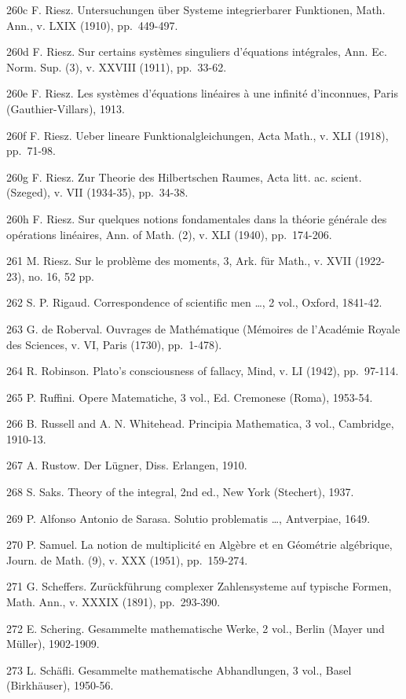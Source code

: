 260c F. Riesz. Untersuchungen über Systeme integrierbarer Funktionen, Math. Ann., v. LXIX (1910), pp.~449-497.

260d F. Riesz. Sur certains systèmes singuliers d'équations intégrales, Ann. Ec. Norm. Sup. (3), v. XXVIII (1911), pp.~33-62.

260e F. Riesz. Les systèmes d'équations linéaires à une infinité d'inconnues, Paris (Gauthier-Villars), 1913.

260f F. Riesz. Ueber lineare Funktionalgleichungen, Acta Math., v. XLI (1918), pp.~71-98.

260g F. Riesz. Zur Theorie des Hilbertschen Raumes, Acta litt. ac. scient. (Szeged), v. VII (1934-35), pp.~34-38.

260h F. Riesz. Sur quelques notions fondamentales dans la théorie générale des opérations linéaires, Ann. of Math. (2), v. XLI (1940), pp.~174-206.

261 M. Riesz. Sur le problème des moments, 3, Ark. für Math., v. XVII (1922-23), no. 16, 52 pp.

262 S. P. Rigaud. Correspondence of scientific men \ldots, 2 vol., Oxford, 1841-42.

263 G. de Roberval. Ouvrages de Mathématique (Mémoires de l'Académie Royale des Sciences, v. VI, Paris (1730), pp.~1-478).

264 R. Robinson. Plato's consciousness of fallacy, Mind, v. LI (1942), pp.~97-114.

265 P. Ruffini. Opere Matematiche, 3 vol., Ed. Cremonese (Roma), 1953-54.

266 B. Russell and A. N. Whitehead. Principia Mathematica, 3 vol., Cambridge, 1910-13.

267 A. Rustow. Der Lügner, Diss. Erlangen, 1910.

268 S. Saks. Theory of the integral, 2nd ed., New York (Stechert), 1937.

269 P. Alfonso Antonio de Sarasa. Solutio problematis \ldots, Antverpiae, 1649.

270 P. Samuel. La notion de multiplicité en Algèbre et en Géométrie algébrique, Journ. de Math. (9), v. XXX (1951), pp.~159-274.

271 G. Scheffers. Zurückführung complexer Zahlensysteme auf typische Formen, Math. Ann., v. XXXIX (1891), pp.~293-390.

272 E. Schering. Gesammelte mathematische Werke, 2 vol., Berlin (Mayer und Müller), 1902-1909.

273 L. Schäfli. Gesammelte mathematische Abhandlungen, 3 vol., Basel (Birkhäuser), 1950-56.

